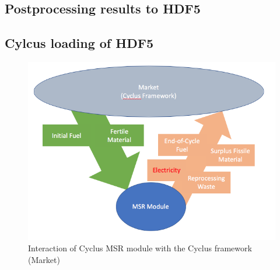 \subsection{Postprocessing results to HDF5}




\subsection{Cylcus loading of HDF5}

\begin{figure}[htbp!]
    \begin{center}
        \includegraphics[scale=0.5]{./images/msr_flowchart.png}
    \end{center}
        \caption{Interaction of Cyclus \gls{MSR} module with the Cyclus framework (Market)}
    \label{fig:msr_int}
\end{figure}

